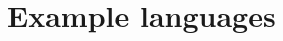 	\section{Example languages} \label{s:resources-viewpoint-template:example-languages}
		\begin{comment}
			Woodside [B37], UML class diagram, UML Object Constraint Language (OMG [B28]).
		\end{comment}